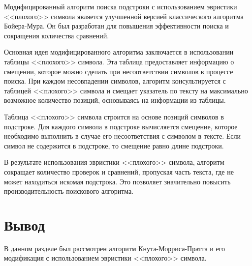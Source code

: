 Модифицированный алгоритм поиска подстроки с использованием эвристики <<плохого>> символа является улучшенной версией классического алгоритма Бойера-Мура. 
Он был разработан для повышения эффективности поиска и сокращения количества сравнений.

Основная идея модифицированного алгоритма заключается в использовании таблицы <<плохого>> символа. 
Эта таблица предоставляет информацию о смещении, которое можно сделать при несоответствии символов в процессе поиска. 
При каждом несовпадении символов, алгоритм консультируется с таблицей <<плохого>> символа и смещает указатель по тексту на максимально возможное количество позиций, основываясь на информации из таблицы.

Таблица <<плохого>> символа строится на основе позиций символов в подстроке. 
Для каждого символа в подстроке вычисляется смещение, которое необходимо выполнить в случае его несоответствия с символом в тексте. 
Если символ не содержится в подстроке, то смещение равно длине подстроки.

В результате использования эвристики <<плохого>> символа, алгоритм сокращает количество проверок и сравнений, пропуская часть текста, где не может находиться искомая подстрока. 
Это позволяет значительно повысить производительность поискового алгоритма.

\section{Вывод}

В данном разделе был рассмотрен алгоритм Кнута-Морриса-Пратта и его модификация с использованием эвристики <<плохого>> символа.